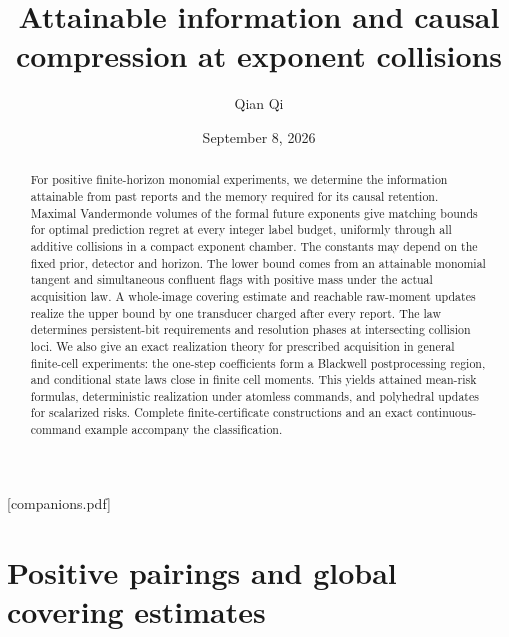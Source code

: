 
\providecommand{\upref}[2]{#1~\ref{#2}}
[companions.pdf]
\title[Attainable information at exponent collisions]{Attainable information and causal compression
at exponent collisions}
\author{Qian Qi}
\date{September 8, 2026}

\begin{abstract}
For positive finite-horizon monomial experiments, we determine the
information attainable from past reports and the memory required for
its causal retention. Maximal Vandermonde volumes of the formal future
exponents give matching bounds for optimal prediction regret at every
integer label budget, uniformly through all additive collisions in a
compact exponent chamber. The constants may depend on the fixed prior,
detector and horizon. The lower bound comes from an attainable monomial
tangent and simultaneous confluent flags with positive mass under the
actual acquisition law. A whole-image covering estimate and reachable
raw-moment updates realize the upper bound by one transducer charged
after every report. The law determines persistent-bit requirements and
resolution phases at intersecting collision loci. We also give an exact
realization theory for prescribed acquisition in general finite-cell
experiments: the one-step coefficients form a Blackwell postprocessing
region, and conditional state laws close in finite cell moments.
This yields attained mean-risk formulas, deterministic realization
under atomless commands, and polyhedral updates for scalarized risks.
Complete finite-certificate constructions and an exact continuous-command
example accompany the classification.
\end{abstract}
\maketitle






\section{Positive pairings and global covering estimates}
\label{sec:analytic-inputs}


